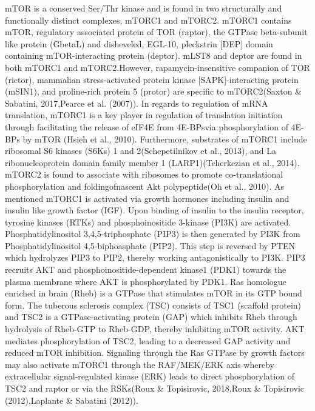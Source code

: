 \documentclass[12pt,openany]{book}
\begin{document}
mTOR is a conserved Ser/Thr kinase and is found in two structurally and
functionally distinct complexes, mTORC1 and mTORC2. mTORC1 contains
mTOR, regulatory associated protein of TOR (raptor), the GTPase
beta-subunit like protein (GbetaL) and disheveled, EGL-10, pleckstrin
{[}DEP{]} domain containing mTOR-interacting protein (deptor). mLST8 and
deptor are found in both mTORC1 and mTORC2.However,
rapamycin-insensitive companion of TOR (rictor), mammalian
stress-activated protein kinase {[}SAPK{]}-interacting protein (mSIN1),
and proline-rich protein 5 (protor) are specific to mTORC2(Saxton \&
Sabatini, 2017,Pearce et al. (2007)). In regards to regulation of mRNA
translation, mTORC1 is a key player in regulation of translation
initiation through facilitating the release of eIF4E from 4E-BPsvia
phosphorylation of 4E-BPs by mTOR (Hsieh et al., 2010). Furthermore,
substrates of mTORC1 include ribosomal S6 kinases (S6Ks) 1 and
2(Schepetilnikov et al., 2013), and La ribonucleoprotein domain family
member 1 (LARP1)(Tcherkezian et al., 2014). mTORC2 is found to associate
with ribosomes to promote co-translational phosphorylation and
foldingofnascent Akt polypeptide(Oh et al., 2010). As mentioned mTORC1
is activated via growth hormones including insulin and insulin like
growth factor (IGF). Upon binding of insulin to the insulin receptor,
tyrosine kinases (RTKs) and phosphoinositide 3-kinase (PI3K) are
activated. Phosphatidylinositol 3,4,5-triphosphate (PIP3) is then
generated by PI3K from Phosphatidylinositol 4,5-biphoasphate (PIP2).
This step is reversed by PTEN which hydrolyzes PIP3 to PIP2, thereby
working antagonistically to PI3K. PIP3 recruits AKT and
phosphoinositide-dependent kinase1 (PDK1) towards the plasma membrane
where AKT is phosphorylated by PDK1. Ras homologue enriched in brain
(Rheb) is a GTPase that stimulates mTOR in its GTP bound form. The
tuberous sclerosis complex (TSC) consists of TSC1 (scaffold protein) and
TSC2 is a GTPase-activating protein (GAP) which inhibits Rheb through
hydrolysis of Rheb-GTP to Rheb-GDP, thereby inhibiting mTOR activity.
AKT mediates phosphorylation of TSC2, leading to a decreased GAP
activity and reduced mTOR inhibition. Signaling through the Ras GTPase
by growth factors may also activate mTORC1 through the RAF/MEK/ERK axis
whereby extracellular signal-regulated kinase (ERK) leads to direct
phosphorylation of TSC2 and raptor or via the RSKs(Roux \& Topisirovic,
2018,Roux \& Topisirovic (2012),Laplante \& Sabatini (2012)).
\end{document}
